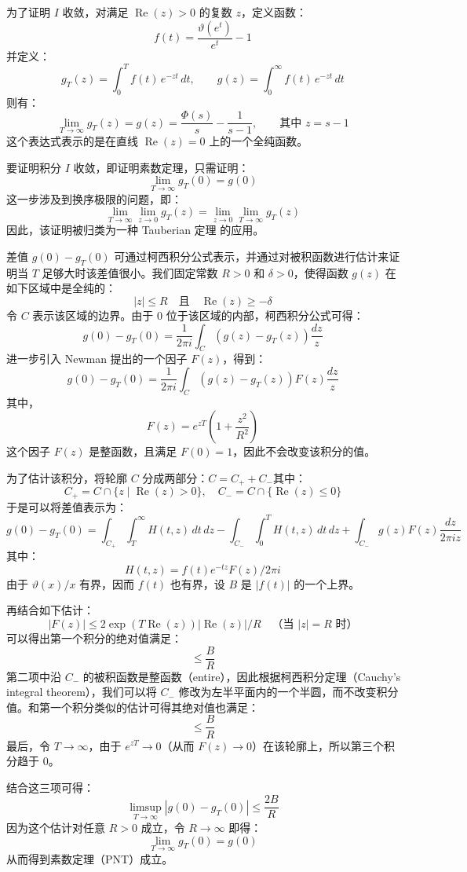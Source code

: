 为了证明 $I$ 收敛，对满足 $\operatorname{Re}(z) > 0$ 的复数 $z$，定义函数：
$$
f(t) = \frac{\vartheta(e^{t})}{e^{t}} - 1~
$$
并定义：
$$
g_T(z) = \int_{0}^{T} f(t)\, e^{-zt} \, dt,\quad\quad g(z) = \int_{0}^{\infty} f(t)\, e^{-zt} \, dt~
$$
则有：
$$
\lim_{T \to \infty} g_T(z) = g(z) = \frac{\Phi(s)}{s} - \frac{1}{s - 1},\quad\quad \text{其中 } z = s - 1~
$$
这个表达式表示的是在直线 $\operatorname{Re}(z) = 0$ 上的一个全纯函数。

要证明积分 $I$ 收敛，即证明素数定理，只需证明：
$$
\lim_{T \to \infty} g_T(0) = g(0)~
$$
这一步涉及到换序极限的问题，即：
$$
\lim_{T \to \infty} \lim_{z \to 0} g_T(z) = \lim_{z \to 0} \lim_{T \to \infty} g_T(z)~
$$
因此，该证明被归类为一种 Tauberian 定理 的应用。

差值 $g(0) - g_T(0)$ 可通过柯西积分公式表示，并通过对被积函数进行估计来证明当 $T$ 足够大时该差值很小。我们固定常数 $R > 0$ 和 $\delta > 0$，使得函数 $g(z)$ 在如下区域中是全纯的：
$$
|z| \leq R \quad \text{且} \quad \operatorname{Re}(z) \geq -\delta~
$$
令 $C$ 表示该区域的边界。由于 $0$ 位于该区域的内部，柯西积分公式可得：
$$
g(0) - g_T(0) = \frac{1}{2\pi i} \int_C \left( g(z) - g_T(z) \right) \frac{dz}{z}~
$$
进一步引入 Newman 提出的一个因子 $F(z)$，得到：
$$
g(0) - g_T(0) = \frac{1}{2\pi i} \int_C \left( g(z) - g_T(z) \right) F(z) \frac{dz}{z}~
$$
其中，
$$
F(z) = e^{zT} \left( 1 + \frac{z^2}{R^2} \right)~
$$
这个因子 $F(z)$ 是整函数，且满足 $F(0) = 1$，因此不会改变该积分的值。

为了估计该积分，将轮廓 $C$ 分成两部分：$C = C_+ + C_-$其中：
$$
C_+ = C \cap \{ z \mid \operatorname{Re}(z) > 0 \}, \quad C_- = C \cap \{ \operatorname{Re}(z) \leq 0 \}~
$$
于是可以将差值表示为：
$$
g(0) - g_T(0) = \int_{C_+} \int_T^\infty H(t, z)\,dt\,dz - \int_{C_-} \int_0^T H(t, z)\,dt\,dz + \int_{C_-} g(z)F(z) \frac{dz}{2\pi i z}~
$$
其中：
$$
H(t, z) = f(t) e^{-tz} F(z)/2\pi i~
$$
由于 $\vartheta(x)/x$ 有界，因而 $f(t)$ 也有界，设 $B$ 是 $|f(t)|$ 的一个上界。

再结合如下估计：
$$
|F(z)| \leq 2 \exp(T \operatorname{Re}(z)) |\operatorname{Re}(z)|/R \quad \text{（当 } |z| = R \text{ 时）}~
$$
可以得出第一个积分的绝对值满足：
$$
\leq \frac{B}{R}~
$$
第二项中沿 $C_-$ 的被积函数是整函数（entire），因此根据柯西积分定理（Cauchy’s integral theorem），我们可以将 $C_-$ 修改为左半平面内的一个半圆，而不改变积分值。和第一个积分类似的估计可得其绝对值也满足：
$$
\leq \frac{B}{R}~
$$
最后，令 $T \to \infty$，由于 $e^{zT} \to 0$（从而 $F(z) \to 0$）在该轮廓上，所以第三个积分趋于 0。

结合这三项可得：
$$
\limsup_{T \to \infty} \left| g(0) - g_T(0) \right| \leq \frac{2B}{R}~
$$
因为这个估计对任意 $R > 0$ 成立，令 $R \to \infty$ 即得：
$$
\lim_{T \to \infty} g_T(0) = g(0)~
$$
从而得到素数定理（PNT）成立。

